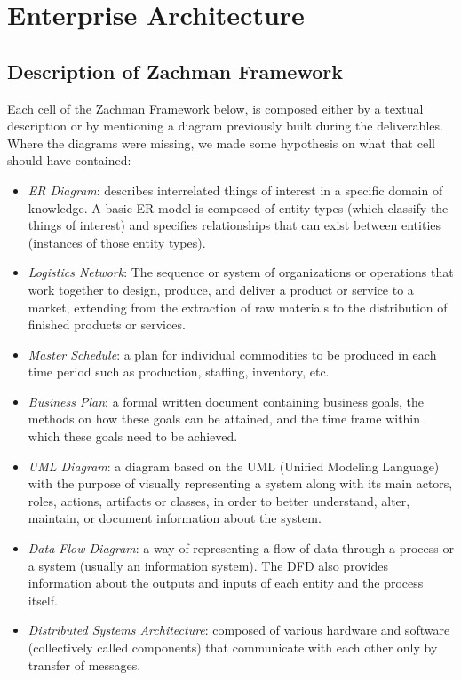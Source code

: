 \documentclass[../main.tex]{subfiles}
\begin{document}
    \section{Enterprise Architecture}
    \subsection{Description of Zachman Framework}
    Each cell of the Zachman Framework below, is composed either by a textual description or by mentioning a diagram previously built during the deliverables.
    Where the diagrams were missing, we made some hypothesis on what that cell should have contained:
    \begin{itemize}
        \item \textit{ER Diagram}: describes interrelated things of interest in a specific domain of knowledge. A basic ER model is composed of entity types (which classify the things of interest) and specifies relationships that can exist between entities (instances of those entity types).
        \item \textit{Logistics Network}: The sequence or system of organizations or operations that work together to design, produce, and deliver a product or service to a market, extending from the extraction of raw materials to the distribution of finished products or services.
        \item \textit{Master Schedule}: a plan for individual commodities to be produced in each time period such as production, staffing, inventory, etc.
        \item \textit{Business Plan}: a formal written document containing business goals, the methods on how these goals can be attained, and the time frame within which these goals need to be achieved.
        \item \textit{UML Diagram}: a diagram based on the UML (Unified Modeling Language) with the purpose of visually representing a system along with its main actors, roles, actions, artifacts or classes, in order to better understand, alter, maintain, or document information about the system.
        \item \textit{Data Flow Diagram}: a way of representing a flow of data through a process or a system (usually an information system). The DFD also provides information about the outputs and inputs of each entity and the process itself.
        \item \textit{Distributed Systems Architecture}: composed of various hardware and software (collectively called components) that communicate with each other only by transfer of messages.

\end{itemize}
\end{document}
